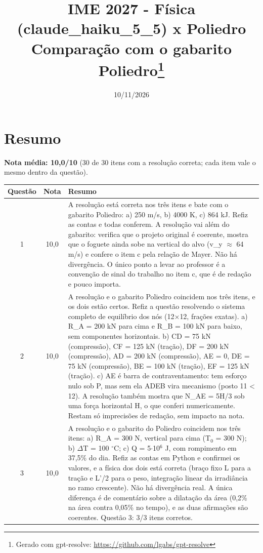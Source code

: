 \documentclass{article}%
\title{IME 2027 {-} Física (claude\_haiku\_5\_5) x Poliedro\\[4pt]\large Comparação com o gabarito Poliedro\thanks{Gerado com gpt-resolve: \url{https://github.com/lgabs/gpt-resolve}}}%
\date{10/11/2026}%
\begin{document}
%
\normalsize%
\maketitle%
\section*{Resumo}\textbf{Nota média: 10,0/10} (30 de 30 itens com a resolução correta; cada item vale o mesmo dentro da questão).\par\medskip%
\begin{longtable}{@{}c c p{}@{}}\toprule Questão & Nota & Resumo \\ \midrule
1 & 10,0 & A resolução está correta nos três itens e bate com o gabarito Poliedro: a) 250 m/s, b) 4000 K, c) 864 kJ. Refiz as contas e todas conferem. A resolução vai além do gabarito: verifica que o projeto original é coerente, mostra que o foguete ainda sobe na vertical do alvo (v\_y $\approx$ 64 m/s) e confere o item c pela relação de Mayer. Não há divergência. O único ponto a levar ao professor é a convenção de sinal do trabalho no item c, que é de redação e pouco importa. \\
2 & 10,0 & A resolução e o gabarito Poliedro coincidem nos três itens, e os dois estão certos. Refiz a questão resolvendo o sistema completo de equilíbrio dos nós (12$\times$12, frações exatas). a) R\_A = 200 kN para cima e R\_B = 100 kN para baixo, sem componentes horizontais. b) CD = 75 kN (compressão), CF = 125 kN (tração), DF = 200 kN (compressão), AD = 200 kN (compressão), AE = 0, DE = 75 kN (compressão), BE = 100 kN (tração), EF = 125 kN (tração). c) AE é barra de contraventamento: tem esforço nulo sob P, mas sem ela ADEB vira mecanismo (posto 11 < 12). A resolução também mostra que N\_AE = 5H/3 sob uma força horizontal H, o que conferi numericamente. Restam só imprecisões de redação, sem impacto na nota. \\
3 & 10,0 & A resolução e o gabarito do Poliedro coincidem nos três itens: a) R\_A = 300 N, vertical para cima (T$_{0}$ = 300 N); b) $\Delta$T = 100 $^\circ$C; c) Q = 5$\cdot$10$^{6}$ J, com rompimento em 37,5\% do dia. Refiz as contas em Python e confirmei os valores, e a física dos dois está correta (braço fixo L para a tração e L'/2 para o peso, integração linear da irradiância no ramo crescente). Não há divergência real. A única diferença é de comentário sobre a dilatação da área (0,2\% na área contra 0,05\% no tempo), e as duas afirmações são coerentes. Questão 3: 3/3 itens corretos. \\

\end{longtable}
\end{document}
